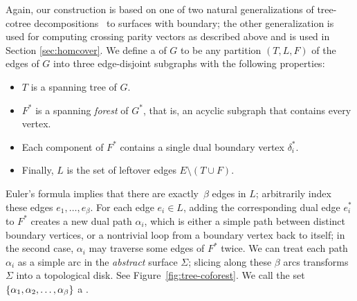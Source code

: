 \documentclass[11pt,twoside]{article}
\def\dualarc{\alpha}
\begin{document}
Again, our construction is based on one of two natural generalizations of tree-cotree decompositions~\cite{e-dgteg-03} to surfaces with boundary; the other generalization is used for computing crossing parity vectors as described above and is used in Section \ref{sec:homcover}.
We define a  of $G$ to be any partition $(T, L, F)$ of the edges of $G$ into three edge-disjoint subgraphs with the following properties:
\begin{itemize}\itemsep0pt
\item $T$ is a spanning tree of $G$.
\item $F^*$ is a spanning \emph{forest} of $G^*$, that is, an acyclic subgraph that contains every vertex.
\item Each component of $F^*$ contains a single dual boundary vertex $\delta_i^*$.
\item Finally, $L$ is the set of leftover edges $E \setminus (T\cup F)$.
\end{itemize}
%
Euler's formula implies that there are exactly~$\beta$ edges in $L$; arbitrarily index these edges $e_1, \dots, e_\beta$.  For each edge $e_i\in L$, adding the corresponding dual edge $e_i^*$ to $F^*$ creates a new dual path $\dualarc_i$, which is either a simple path between distinct boundary vertices, or a nontrivial loop from a boundary vertex back to itself; in the second case, $\dualarc_i$ may traverse some edges of $F^*$ twice.  We can treat each path $\dualarc_i$ as a simple arc in the \emph{abstract} surface $\Sigma$; slicing along these $\beta$ arcs transforms $\Sigma$ into a topological disk.
See Figure~\ref{fig:tree-coforest}.  We call the set $\set{\dualarc_1, \dualarc_2, \dots, \dualarc_\beta}$ a .
\end{document}

